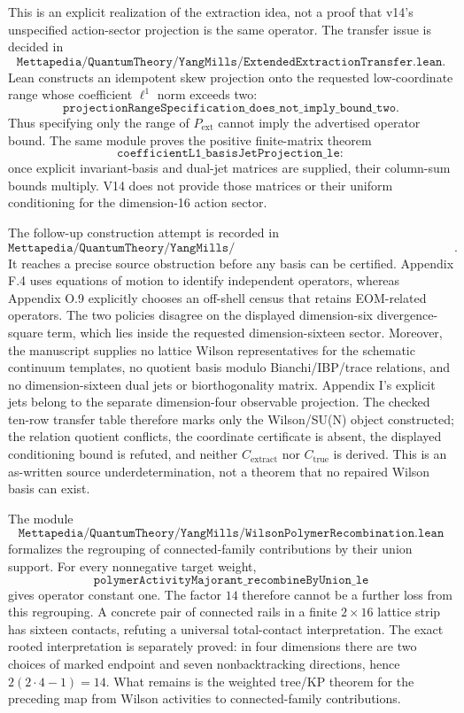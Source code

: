 \documentclass[11pt]{article}
\newcommand{\lean}[1]{\texttt{#1}}
\begin{document}
This is an explicit realization of the extraction idea, not a proof that v14's
unspecified action-sector projection is the same operator.  The transfer issue
is decided in
\[
  \lean{Mettapedia/QuantumTheory/YangMills/ExtendedExtractionTransfer.lean}.
\]
Lean constructs an idempotent skew projection onto the requested low-coordinate
range whose coefficient \(\ell^1\) norm exceeds two:
\[
  \lean{projectionRangeSpecification\_does\_not\_imply\_bound\_two}.
\]
Thus specifying only the range of \(P_{\mathrm{ext}}\) cannot imply the advertised
operator bound.  The same module proves the positive finite-matrix theorem
\[
  \lean{coefficientL1\_basisJetProjection\_le}:
\]
once explicit invariant-basis and dual-jet matrices are supplied, their
column-sum bounds multiply.  V14 does not provide those matrices or their
uniform conditioning for the dimension-16 action sector.

The follow-up construction attempt is recorded in
\[
  \lean{Mettapedia/QuantumTheory/YangMills/Dimension16WilsonExtractionCertificate.lean}.
\]
It reaches a precise source obstruction before any basis can be certified.
Appendix F.4 uses equations of motion to identify independent operators,
whereas Appendix O.9 explicitly chooses an off-shell census that retains
EOM-related operators.  The two policies disagree on the displayed
dimension-six divergence-square term, which lies inside the requested
dimension-sixteen sector.  Moreover, the manuscript supplies no lattice
Wilson representatives for the schematic continuum templates, no quotient
basis modulo Bianchi/IBP/trace relations, and no dimension-sixteen dual jets or
biorthogonality matrix.  Appendix I's explicit jets belong to the separate
dimension-four observable projection.  The checked ten-row transfer table
therefore marks only the Wilson/SU(N) object constructed; the relation quotient
conflicts, the coordinate certificate is absent, the displayed conditioning
bound is refuted, and neither \(C_{\mathrm{extract}}\) nor
\(C_{\mathrm{true}}\) is derived.  This is an as-written source
underdetermination, not a theorem that no repaired Wilson basis can exist.

The module
\[
  \lean{Mettapedia/QuantumTheory/YangMills/WilsonPolymerRecombination.lean}
\]
formalizes the regrouping of connected-family contributions by their union
support.  For every nonnegative target weight,
\[
  \lean{polymerActivityMajorant\_recombineByUnion\_le}
\]
gives operator constant one.  The factor \(14\) therefore cannot be a further
loss from this regrouping.  A concrete pair of connected rails in a finite
\(2\times16\) lattice strip has sixteen contacts, refuting a universal
total-contact interpretation.  The exact rooted interpretation is separately
proved: in four dimensions there are two choices of marked endpoint and seven
nonbacktracking directions, hence \(2(2\cdot4-1)=14\).  What remains is the
weighted tree/KP theorem for the preceding map from Wilson activities to
connected-family contributions.
\end{document}
